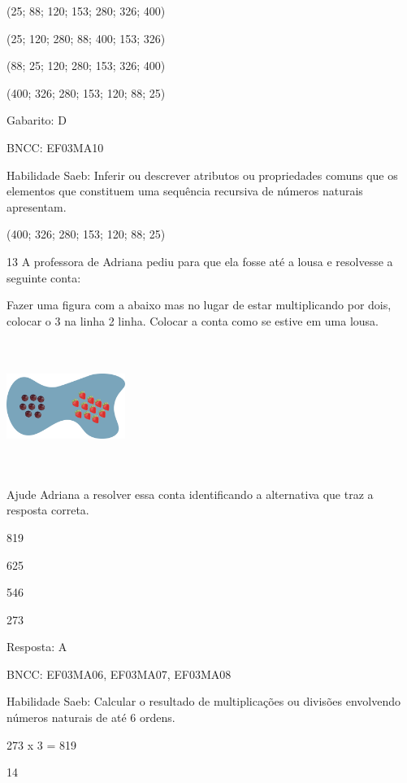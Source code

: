 \begin{escolha}
\begin{escolha}
\item
  (25; 88; 120; 153; 280; 326; 400)
\item
  (25; 120; 280; 88; 400; 153; 326)
\item
  (88; 25; 120; 280; 153; 326; 400)
\item
  (400; 326; 280; 153; 120; 88; 25)
\end{escolha}

Gabarito: D

BNCC: EF03MA10

Habilidade Saeb: Inferir ou descrever atributos ou propriedades comuns
que os elementos que constituem uma sequência recursiva de números
naturais apresentam.

(400; 326; 280; 153; 120; 88; 25)

\num{13} A professora de Adriana pediu para que ela fosse até a lousa e
resolvesse a seguinte conta:

Fazer uma figura com a abaixo mas no lugar de estar multiplicando por
dois, colocar o 3 na linha 2 linha. Colocar a conta como se estive em
uma lousa.

\includegraphics[width=1.51680in,height=1.67515in]{media/image114.png}

Ajude Adriana a resolver essa conta identificando a alternativa que traz
a resposta correta.

\begin{escolha}
\item
  819
\item
  625
\item
  546
\item
  273
\end{escolha}

Resposta: A

BNCC: EF03MA06, EF03MA07, EF03MA08

Habilidade Saeb: Calcular o resultado de multiplicações ou divisões
envolvendo números naturais de até 6 ordens.

273 x 3 = 819

\num{14}


\end{escolha}
